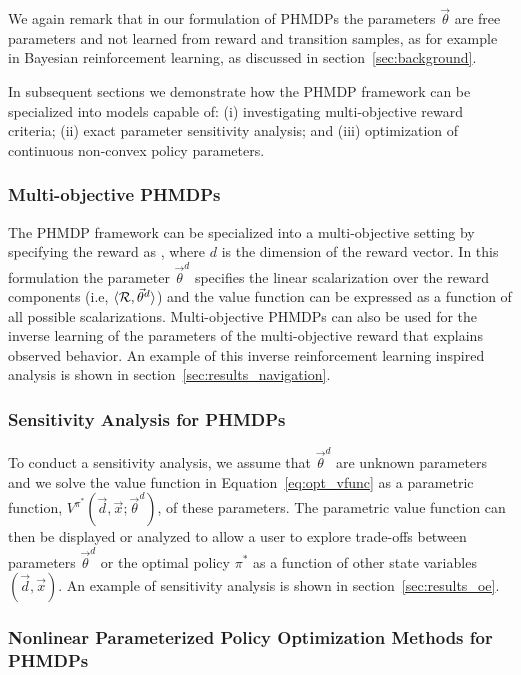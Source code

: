 We again remark that in our formulation of PHMDPs the parameters {\footnotesize $ \vec{\theta} $} are free parameters and not
learned from reward and transition samples, as for example in Bayesian reinforcement learning, as discussed in section~\ref{sec:background}. 

In subsequent sections we demonstrate how the PHMDP framework can be specialized into models capable of: (i) investigating multi-objective reward criteria; (ii) exact parameter sensitivity analysis; and (iii) optimization of continuous non-convex policy parameters.

\subsubsection{Multi-objective PHMDPs}

The PHMDP framework can be specialized into a multi-objective setting by specifying the reward as {\footnotesize \MORewardFunc}, where {\footnotesize $ d $} is the dimension of the reward vector. In this formulation the parameter {\footnotesize $ \vec{\theta}^{d} $} specifies the linear scalarization over the reward components (i.e, {\footnotesize $\langle \mathcal{R}, \vec{\theta}^{d} \rangle$}) and the value function can be expressed as a function of all possible scalarizations. Multi-objective PHMDPs can also be used for the inverse learning of the parameters of the multi-objective reward that explains observed behavior. An example of this inverse reinforcement learning inspired analysis is shown in section~\ref{sec:results_navigation}.

\subsubsection{Sensitivity Analysis for PHMDPs}

To conduct a sensitivity analysis, we assume that {\footnotesize $\vec{\theta}^{d}$} are unknown parameters and we solve the value function in Equation~\eqref{eq:opt_vfunc} as a parametric function, {\footnotesize $V^{\pi^{*}}(\vec{d}, \vec{x}; \vec{\theta}^{d})$}, of these parameters. The parametric value function can then be displayed or analyzed to allow a user to explore trade-offs between parameters {\footnotesize $\vec{\theta}^{d}$} or the optimal policy {\footnotesize $ \pi^{*} $} as a function of other state variables {\footnotesize $(\vec{d}, \vec{x})$}. An example of sensitivity analysis is shown in section~\ref{sec:results_oe}.

\subsubsection{Nonlinear Parameterized Policy Optimization Methods for PHMDPs}

